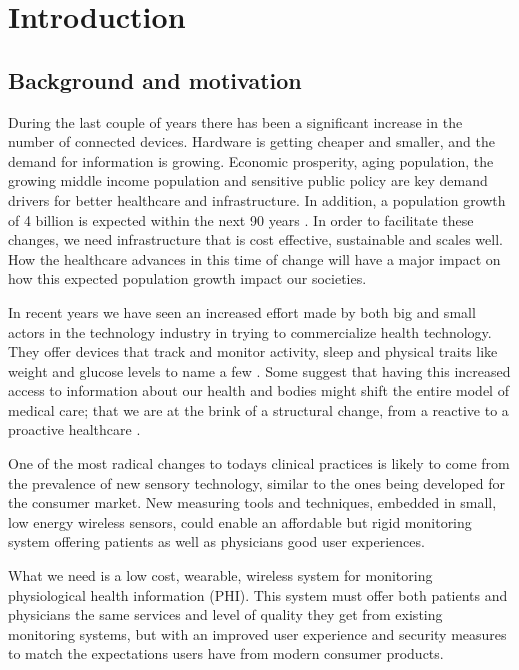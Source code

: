 \section{Introduction} 

\label{sec:introduction}

\subsection{Background and motivation} 

\label{sub:background_and_motivation}

During the last couple of years there has been a significant increase in the number of connected devices. Hardware is getting cheaper and smaller, and the demand for information is growing. Economic prosperity, aging population, the growing middle income population and sensitive public policy are key demand drivers for better healthcare and infrastructure. In addition, a population growth of 4 billion is expected within the next 90 years \cite{WPP2015:Methodology}. In order to facilitate these changes, we need infrastructure that is cost effective, sustainable and scales well. How the healthcare advances in this time of change will have a major impact on how this expected population growth impact our societies. 

In recent years we have seen an increased effort made by both big and small actors in the technology industry in trying to commercialize health technology. They offer devices that track and monitor activity, sleep and physical traits like weight and glucose levels to name a few \cite{fitbit, fitbit:scale:6}. Some suggest that having this increased access to information about our health and bodies might shift the entire model of medical care; that we are at the brink of a structural change, from a reactive to a proactive healthcare \cite{lynnechou:7, helsit:kari:8, johnmaeda:9, deloitte:healthcare3:0:10}.

One of the most radical changes to todays clinical practices is likely to come from the prevalence of new sensory technology, similar to the ones being developed for the consumer market. New measuring tools and techniques, embedded in small, low energy wireless sensors, could enable an affordable but rigid monitoring system offering patients as well as physicians good user experiences. 

What we need is a low cost, wearable, wireless system for monitoring physiological health information (PHI). This system must offer both patients and physicians the same services and level of quality they get from existing monitoring systems, but with an improved user experience and security measures to match the expectations users have from modern consumer products. 

